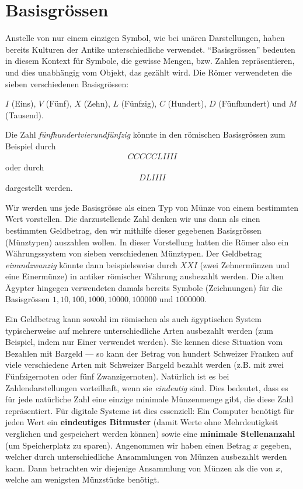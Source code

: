 \section{Basisgrössen}\label{section:Basisgroessen}
Anstelle von nur einem einzigen Symbol, wie bei unären Darstellungen, haben bereits Kulturen der Antike unterschiedliche
 verwendet. \enquote{Basisgrössen} bedeuten in diesem Kontext für Symbole, die gewisse Mengen, bzw. Zahlen repräsentieren, und dies unabhängig vom Objekt, das gezählt wird. Die Römer verwendeten die sieben verschiedenen Basisgrössen:
\begin{center}
	$I$ (Eins), $V$ (Fünf), $X$ (Zehn), $L$ (Fünfzig), $C$ (Hundert), $D$ (Fünfhundert) und $M$ (Tausend).
\end{center}
\begin{myexample}\label{myexample:roman}
Die Zahl \textit{fünfhundertvierundfünfzig} könnte in den römischen Basisgrössen zum Beispiel durch
\begin{align*}
	CCCCCLIIII
\end{align*}
oder durch
\begin{align*}
	DLIIII
\end{align*}
dargestellt werden.
\end{myexample}
Wir werden uns jede Basisgrösse als einen Typ von Münze von einem bestimmten Wert vorstellen. Die darzustellende Zahl
denken wir uns dann als einen bestimmten Geldbetrag, den wir mithilfe dieser gegebenen Basisgrössen (Münztypen) auszahlen wollen. In
dieser Vorstellung hatten die Römer also ein Währungssystem von sieben verschiedenen Münztypen. Der Geldbetrag \textit{einundzwanzig} könnte
dann beispielsweise durch $XXI$ (zwei Zehnermünzen und eine Einermünze) in antiker römischer Währung ausbezahlt werden. Die alten Ägypter hingegen verwendeten damals bereits Symbole (Zeichnungen) für die Basisgrössen $1, 10, 100, 1000, 10000,
	100000$ und $1000000$.

Ein Geldbetrag kann sowohl im römischen als auch ägyptischen System typischerweise auf mehrere unterschiedliche Arten
ausbezahlt werden (zum Beispiel, indem nur Einer verwendet werden). Sie kennen diese Situation vom Bezahlen mit
Bargeld --- so kann der Betrag von hundert Schweizer Franken auf viele verschiedene Arten mit Schweizer Bargeld bezahlt werden
(z.B. mit zwei Fünfzigernoten oder fünf Zwanzigernoten). Natürlich ist
es bei Zahlendarstellungen vorteilhaft, wenn sie \textit{eindeutig} sind. Dies bedeutet, dass es für jede natürliche Zahl eine einzige minimale Münzenmenge gibt, die diese Zahl repräsentiert. Für digitale Systeme ist dies essenziell: Ein Computer benötigt für jeden Wert ein \textbf{eindeutiges Bitmuster} (damit Werte ohne Mehrdeutigkeit verglichen und gespeichert werden können) sowie eine \textbf{minimale Stellenanzahl} (um Speicherplatz zu sparen). Angenommen wir haben einen Betrag $x$ gegeben, welcher durch
unterschiedliche Ansammlungen von Münzen ausbezahlt werden kann. Dann betrachten wir diejenige Ansammlung von Münzen als
die  von $x$, welche am wenigsten Münzstücke benötigt.

